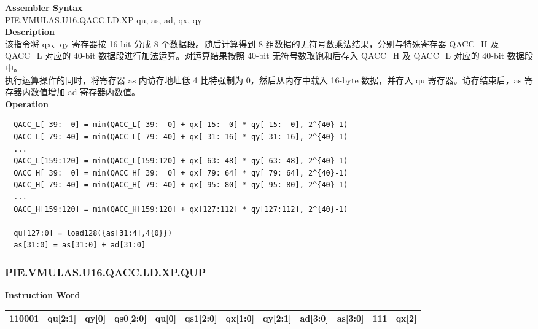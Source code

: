\textbf{Assembler Syntax} \\
PIE.VMULAS.U16.QACC.LD.XP qu, as, ad, qx, qy \\
\textbf{Description} \\
该指令将 qx、qy 寄存器按 16-bit 分成 8 个数据段。随后计算得到 8 组数据的无符号数乘法结果，分别与特殊寄存器 QACC\_H 及 QACC\_L 对应的 40-bit 数据段进行加法运算。对运算结果按照 40-bit 无符号数取饱和后存入 QACC\_H 及 QACC\_L 对应的 40-bit 数据段中。\\
执行运算操作的同时，将寄存器 as 内访存地址低 4 比特强制为 0，然后从内存中载入 16-byte 数据，并存入 qu 寄存器。访存结束后，as 寄存器内数值增加 ad 寄存器内数值。\\
\textbf{Operation}
\begin{lstlisting}
  QACC_L[ 39:  0] = min(QACC_L[ 39:  0] + qx[ 15:  0] * qy[ 15:  0], 2^{40}-1)
  QACC_L[ 79: 40] = min(QACC_L[ 79: 40] + qx[ 31: 16] * qy[ 31: 16], 2^{40}-1)
  ...
  QACC_L[159:120] = min(QACC_L[159:120] + qx[ 63: 48] * qy[ 63: 48], 2^{40}-1)
  QACC_H[ 39:  0] = min(QACC_H[ 39:  0] + qx[ 79: 64] * qy[ 79: 64], 2^{40}-1)
  QACC_H[ 79: 40] = min(QACC_H[ 79: 40] + qx[ 95: 80] * qy[ 95: 80], 2^{40}-1)
  ...
  QACC_H[159:120] = min(QACC_H[159:120] + qx[127:112] * qy[127:112], 2^{40}-1)

  qu[127:0] = load128({as[31:4],4{0}})
  as[31:0] = as[31:0] + ad[31:0]
\end{lstlisting}

\newpage
\subsubsection{PIE.VMULAS.U16.QACC.LD.XP.QUP}\label{instruction:PIEVMULASU16QACCLDXPQUP}
\setlength\tabcolsep{6pt}
\textbf{Instruction Word} \\
\begin{tabular}{|c|c|c|c|c|c|c|c|c|c|c|c|}
	\hline
	110001 & qu[2:1] & qy[0] & qs0[2:0] & qu[0] & qs1[2:0] & qx[1:0] & qy[2:1] & ad[3:0] & as[3:0] & 111 & qx[2] \\
	\hline
\end{tabular}

